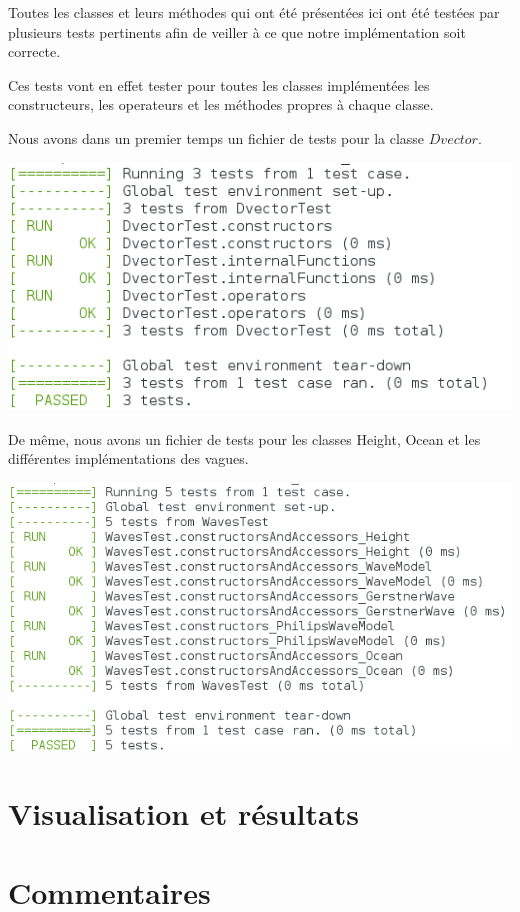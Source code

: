 \documentclass{article}
\begin{document}
Toutes les classes et leurs méthodes qui ont été présentées ici ont été testées par plusieurs tests pertinents afin de veiller à ce que notre implémentation soit correcte.

Ces tests vont en effet tester pour toutes les classes implémentées les constructeurs, les operateurs et les méthodes propres à chaque classe.

Nous avons dans un premier temps un fichier de tests pour la classe $Dvector$.

\vspace{0.5cm}

\includegraphics[scale=0.7]{./res/Test_Dvector.png}

\vspace{0.5cm}

De même, nous avons un fichier de tests pour les classes Height, Ocean et les différentes implémentations des vagues.

\vspace{0.5cm}

\includegraphics[scale=0.7]{./res/Test_Waves.png}

\vspace{1cm}


\section{Visualisation et résultats}

\vspace{1cm}

\section{Commentaires}
\end{document}
